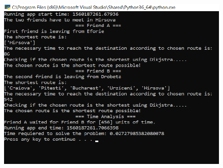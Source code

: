 \documentclass[12pt]{article}
\begin{document}
\begin{figure}[H]
\advance\leftskip 0.6in		\includegraphics[width=6.3in,height=4.68in]{./media/image4.png}
\end{figure}


\end{document}
